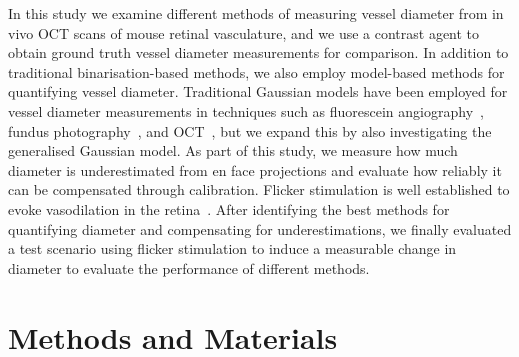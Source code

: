 \documentclass{optica-article}
\begin{document}
In this study we examine different methods of measuring vessel diameter from in vivo OCT scans of mouse retinal vasculature, and we use a contrast agent to obtain ground truth vessel diameter measurements for comparison. In addition to traditional binarisation-based methods, we also employ model-based methods for quantifying vessel diameter. Traditional Gaussian models have been employed for vessel diameter measurements in techniques such as fluorescein angiography~\cite{zhouDetectionQuantificationRetinopathy1994}, fundus photography~\cite{lowellMeasurementRetinalVessel2004}, and OCT~\cite{leahyMapping3DConnectivity2015}, but we expand this by also investigating the generalised Gaussian model. As part of this study, we measure how much diameter is underestimated from en face projections and evaluate how reliably it can be compensated through calibration. Flicker stimulation is well established to evoke vasodilation in the retina~\cite{garhoferDiffuseLuminanceFlicker2004,sharifizadFactorsDeterminingFlickerinduced2016,michelsonFlickeringLightIncreases2002,aschingerEffectofDiffuse2017,kornfieldRegulationBloodFlow2014,shihQuantitativeRetinalChoroidal2013,sonOpticalCoherenceTomography2016}. After identifying the best methods for quantifying diameter and compensating for underestimations, we finally evaluated a test scenario using flicker stimulation to induce a measurable change in diameter to evaluate the performance of different methods.

\section{Methods and Materials}
\end{document}
